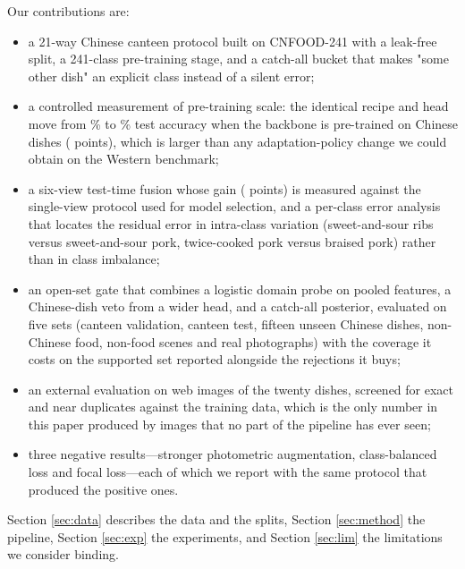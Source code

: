 Our contributions are:
\begin{itemize}
\item a 21-way Chinese canteen protocol built on CNFOOD-241 \cite{cnfood241}
with a leak-free split, a 241-class pre-training stage, and a catch-all bucket
that makes "some other dish" an explicit class instead of a silent error;
\item a controlled measurement of pre-training scale: the identical recipe and
head move from \cnNoPreTest\% to \cnTest\% test accuracy when the backbone is
pre-trained on Chinese dishes (\cnGainPretrain{} points), which is larger than
any adaptation-policy change we could obtain on the Western benchmark;
\item a six-view test-time fusion whose gain (\cnFuseGain{} points) is measured
against the single-view protocol used for model selection, and a per-class error
analysis that locates the residual error in intra-class variation
(sweet-and-sour ribs versus sweet-and-sour pork, twice-cooked pork versus
braised pork) rather than in class imbalance;
\item an open-set gate that combines a logistic domain probe on pooled features,
a Chinese-dish veto from a wider head, and a catch-all posterior, evaluated on
five sets (canteen validation, canteen test, fifteen unseen Chinese dishes,
non-Chinese food, non-food scenes and real photographs) with the coverage it
costs on the supported set reported alongside the rejections it buys;
\item an external evaluation on \webN{} web images of the twenty dishes,
screened for exact and near duplicates against the training data, which is the
only number in this paper produced by images that no part of the pipeline has
ever seen;
\item three negative results---stronger photometric augmentation,
class-balanced loss and focal loss---each of which we report with the same
protocol that produced the positive ones.
\end{itemize}

Section \ref{sec:data} describes the data and the splits, Section
\ref{sec:method} the pipeline, Section \ref{sec:exp} the experiments, and
Section \ref{sec:lim} the limitations we consider binding.

